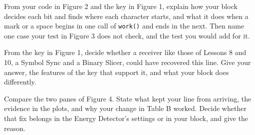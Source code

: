 \documentclass{exam}
\begin{document}
\begin{Form}
\begin{questions}
\question From your code in Figure 2 and the key in Figure 1, explain how your block decides each
bit and finds where each character starts, and what it does when a mark or a space begins in one
call of \texttt{work()} and ends in the next. Then name one case your test in Figure 3 does not
check, and the test you would add for it.
	\begin{solution}[1.7in]\end{solution}

\question From the key in Figure 1, decide whether a receiver like those of Lessons 8 and 10, a
Symbol Sync and a Binary Slicer, could have recovered this line. Give your answer, the features of
the key that support it, and what your block does differently.
	\begin{solution}[1.7in]\end{solution}

\newpage
\question Compare the two panes of Figure 4. State what kept your line from arriving, the evidence
in the plots, and why your change in Table B worked. Decide whether that fix belongs in the Energy
Detector's settings or in your block, and give the reason.
	\begin{solution}[3.0in]\end{solution}

\end{questions}

\docstatement

\end{Form}
\end{document}
